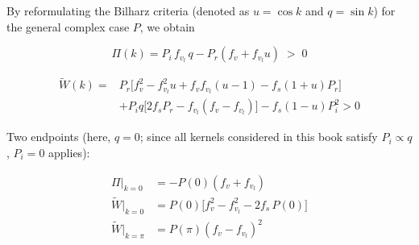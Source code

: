 \documentclass[11pt,a4paper,openany]{book}
\numberwithin{equation}{chapter}
\numberwithin{figure}{chapter}
\numberwithin{table}{chapter}
\begin{document}
By reformulating the Bilharz criteria (denoted as $u=\cos k$ and $q=\sin k$) for the general complex case $P$, we obtain










\begin{tcolorbox}[keybox,title=\textbf{Condition I}]
\begin{equation}
\Pi(k) = P_i\,f_{v_l}\,q - P_r\left(f_v + f_{v_l}u\right) \;>\; 0
\end{equation}
\end{tcolorbox}

\begin{tcolorbox}[keybox,title=\textbf{Condition II}]
\begin{equation}
\begin{aligned}
\widetilde W(k)={}&P_r\Big[f_v^2-f_{v_l}^2u+f_vf_{v_l}(u-1)-f_s(1+u)P_r\Big]\\
&+P_i q\Big[2f_sP_r-f_{v_l}(f_v-f_{v_l})\Big]
-f_s(1-u)P_i^2>0
\end{aligned}
\end{equation}
\end{tcolorbox}





Two endpoints (here, $q=0$; since all kernels considered in this book satisfy $P_i\propto q$, $P_i=0$ applies):

\begin{align}
\Pi\big|_{k=0} &= -P(0)\left(f_v+f_{v_l}\right) \\
\widetilde W\big|_{k=0} &= P(0)\Big[f_v^2 - f_{v_l}^2 - 2f_s\,P(0)\Big]
\label{eq:Wend}\\
\widetilde W\big|_{k=\pi} &= P(\pi)\left(f_v-f_{v_l}\right)^2
\end{align}
\end{document}
